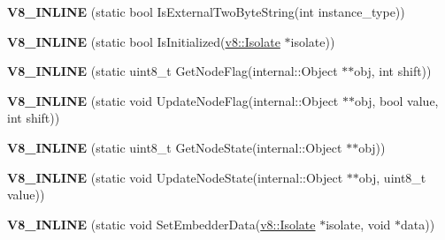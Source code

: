 \begin{DoxyCompactItemize}
\item 
\hypertarget{classv8_1_1internal_1_1_internals_a8669706ae5c335380476712690905e3c}{}{\bfseries V8\+\_\+\+I\+N\+L\+I\+N\+E} (static bool Is\+External\+Two\+Byte\+String(int instance\+\_\+type))\label{classv8_1_1internal_1_1_internals_a8669706ae5c335380476712690905e3c}

\item 
\hypertarget{classv8_1_1internal_1_1_internals_ade46ce787cf0135bde4fe6a9a1c59fdf}{}{\bfseries V8\+\_\+\+I\+N\+L\+I\+N\+E} (static bool Is\+Initialized(\hyperlink{classv8_1_1_isolate}{v8\+::\+Isolate} $\ast$isolate))\label{classv8_1_1internal_1_1_internals_ade46ce787cf0135bde4fe6a9a1c59fdf}

\item 
\hypertarget{classv8_1_1internal_1_1_internals_acc75beba18c48011d4f64f08cd590812}{}{\bfseries V8\+\_\+\+I\+N\+L\+I\+N\+E} (static uint8\+\_\+t Get\+Node\+Flag(internal\+::\+Object $\ast$$\ast$obj, int shift))\label{classv8_1_1internal_1_1_internals_acc75beba18c48011d4f64f08cd590812}

\item 
\hypertarget{classv8_1_1internal_1_1_internals_abd298c1791d3e9373a814deb9c717f62}{}{\bfseries V8\+\_\+\+I\+N\+L\+I\+N\+E} (static void Update\+Node\+Flag(internal\+::\+Object $\ast$$\ast$obj, bool value, int shift))\label{classv8_1_1internal_1_1_internals_abd298c1791d3e9373a814deb9c717f62}

\item 
\hypertarget{classv8_1_1internal_1_1_internals_a98601669f2eada958867d2d6dd036bbb}{}{\bfseries V8\+\_\+\+I\+N\+L\+I\+N\+E} (static uint8\+\_\+t Get\+Node\+State(internal\+::\+Object $\ast$$\ast$obj))\label{classv8_1_1internal_1_1_internals_a98601669f2eada958867d2d6dd036bbb}

\item 
\hypertarget{classv8_1_1internal_1_1_internals_a8d572dfc7c7b714ed08e9b0a5985dae0}{}{\bfseries V8\+\_\+\+I\+N\+L\+I\+N\+E} (static void Update\+Node\+State(internal\+::\+Object $\ast$$\ast$obj, uint8\+\_\+t value))\label{classv8_1_1internal_1_1_internals_a8d572dfc7c7b714ed08e9b0a5985dae0}

\item 
\hypertarget{classv8_1_1internal_1_1_internals_ac6230ed520366326b168af58dc10dbd3}{}{\bfseries V8\+\_\+\+I\+N\+L\+I\+N\+E} (static void Set\+Embedder\+Data(\hyperlink{classv8_1_1_isolate}{v8\+::\+Isolate} $\ast$isolate, void $\ast$data))\label{classv8_1_1internal_1_1_internals_ac6230ed520366326b168af58dc10dbd3}


\end{DoxyCompactItemize}
